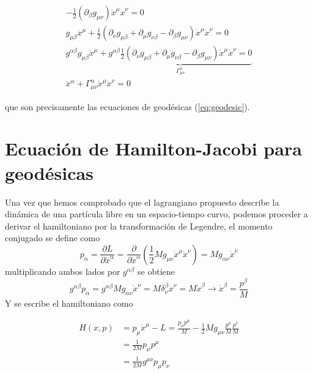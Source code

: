 \begin{equation}
\begin{aligned}
        - \frac{1}{2}  \left( \partial_\beta g_{\mu \nu} \right) \dot{x}^\mu \dot{x}^\nu = 0                                                                                                                                                            \\
        g_{\mu \beta}  \ddot{x}^\mu+
        \frac{1}{2}\left(\partial_\nu g_{\mu \beta } + \partial_\mu g_{\nu \beta } -  \partial_\beta g_{\mu \nu} \right) \dot{x}^\mu \dot{x}^\nu = 0                                                                                                    \\
        g^{\alpha \beta}g_{\mu \beta}  \ddot{x}^\mu+
        \underbrace{g^{\alpha \beta}\frac{1}{2}\left(\partial_\nu g_{\mu \beta } + \partial_\mu g_{\nu \beta } -  \partial_\beta g_{\mu \nu} \right) \dot{x}^\mu \dot{x}^\nu = 0}_{\Gamma^\alpha_{\mu \nu}}                                             \\
        \ddot{x}^\alpha + \Gamma^\alpha_{\mu \nu} \dot{x}^\mu \dot{x}^\nu = 0
    \end{aligned}
\end{equation}

que son precisamente las ecuaciones de geodésicas (\ref{eq:geodesic}).

\section{Ecuación de Hamilton-Jacobi para geodésicas}
Una vez que hemos comprobado que el lagrangiano propuesto describe la dinámica de una partícula libre en un espacio-tiempo curvo, podemos proceder a derivar el hamiltoniano por la transformación de Legendre, el momento conjugado se define como
\begin{equation}
    p_\alpha=\frac{\partial L}{\partial \dot{x}^\alpha}=\frac{\partial }{\partial \dot{x}^\alpha}\left( \frac{1}{2} M g_{\mu \nu} \dot{x}^\mu \dot{x}^\nu\right)= M g_{\alpha \nu} \dot{x}^\nu
\end{equation}
multiplicando ambos lados por $g^{\alpha \beta}$ se obtiene
\begin{equation}
    g^{\alpha \beta} p_\alpha = g^{\alpha \beta} M g_{\alpha \nu} \dot{x}^\nu = M \delta^\beta_\nu \dot{x}^\nu = M \dot{x}^\beta \rightarrow  \dot{x}^\beta= \frac{p^{\beta}}{M}
\end{equation}
Y se escribe el hamiltoniano como

\begin{equation}
    \begin{aligned}
        H(x, p) & =p_\mu \dot{x}^\mu-L=  \frac{p_\mu p^{\mu}}{M} -\frac{1}{2} M g_{\mu \nu} \frac{p^{\mu}}{M} \frac{p^{\nu}}{M} \\
                & = \frac{1}{2M}  p_\mu p^{\mu}                                                                                 \\
                & = \frac{1}{2M} g^{\mu \nu} p_\mu p_\nu
    \end{aligned}
\end{equation}

